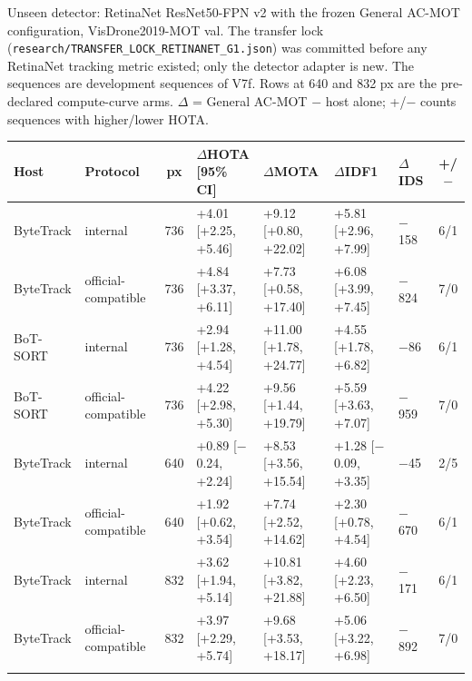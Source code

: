 \begin{tableorg}[!htbp]
\centering
\caption{Unseen detector: RetinaNet ResNet50-FPN v2 with the frozen General AC-MOT configuration, VisDrone2019-MOT val. The transfer lock (\texttt{research/TRANSFER\_LOCK\_RETINANET\_G1.json}) was committed before any RetinaNet tracking metric existed; only the detector adapter is new. The sequences are development sequences of V7f. Rows at 640 and 832 px are the pre-declared compute-curve arms. $\Delta$ = General AC-MOT $-$ host alone; +/$-$ counts sequences with higher/lower HOTA.}
\label{tab:retinanet}
\footnotesize
\setlength\tabcolsep{3.5pt}
\begin{adjustbox}{max width=\linewidth}
\begin{tabular}{llcllllc}
\toprule
Host & Protocol & px & $\Delta$HOTA [95\% CI] & $\Delta$MOTA & $\Delta$IDF1 & $\Delta$IDS & +/$-$ \\
\midrule
ByteTrack & internal & 736 & +4.01 [+2.25, +5.46] & +9.12 [+0.80, +22.02] & +5.81 [+2.96, +7.99] & \ensuremath{-}158 & 6/1 \\
ByteTrack & official-compatible & 736 & +4.84 [+3.37, +6.11] & +7.73 [+0.58, +17.40] & +6.08 [+3.99, +7.45] & \ensuremath{-}824 & 7/0 \\
BoT-SORT & internal & 736 & +2.94 [+1.28, +4.54] & +11.00 [+1.78, +24.77] & +4.55 [+1.78, +6.82] & \ensuremath{-}86 & 6/1 \\
BoT-SORT & official-compatible & 736 & +4.22 [+2.98, +5.30] & +9.56 [+1.44, +19.79] & +5.59 [+3.63, +7.07] & \ensuremath{-}959 & 7/0 \\
ByteTrack & internal & 640 & +0.89 [\ensuremath{-}0.24, +2.24] & +8.53 [+3.56, +15.54] & +1.28 [\ensuremath{-}0.09, +3.35] & \ensuremath{-}45 & 2/5 \\
ByteTrack & official-compatible & 640 & +1.92 [+0.62, +3.54] & +7.74 [+2.52, +14.62] & +2.30 [+0.78, +4.54] & \ensuremath{-}670 & 6/1 \\
ByteTrack & internal & 832 & +3.62 [+1.94, +5.14] & +10.81 [+3.82, +21.88] & +4.60 [+2.23, +6.50] & \ensuremath{-}171 & 6/1 \\
ByteTrack & official-compatible & 832 & +3.97 [+2.29, +5.74] & +9.68 [+3.53, +18.17] & +5.06 [+3.22, +6.98] & \ensuremath{-}892 & 7/0 \\
\botrule
\end{tabular}
\end{adjustbox}
\end{tableorg}
